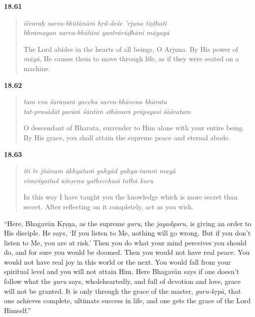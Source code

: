 \par\noindent\textbf{18.61}\par
\begin{verse}
\textit{īśvaraḥ sarva-bhūtānāṁ hṛd-deśe ’rjuna tiṣṭhati} \\
\textit{bhrāmayan sarva-bhūtāni yantrārūḍhāni māyayā}

\noindent The Lord abides in the hearts of all beings, O Arjuna. By His power of \textit{māyā}, He causes them to move through life, as if they were seated on a machine.
\end{verse}
\par



\par\noindent\textbf{18.62}\par
\begin{verse}
\textit{tam eva śaraṇaṁ gaccha sarva-bhāvena bhārata} \\
\textit{tat-prasādāt parāṁ śāntiṁ sthānaṁ prāpsyasi śāśvatam}

\noindent O descendant of Bharata, surrender to Him alone with your entire being. By His grace, you shall attain the supreme peace and eternal abode.
\end{verse}
\par



\par\noindent\textbf{18.63}\par
\begin{verse}
\textit{iti te jñānam ākhyātaṁ guhyād guhya-taraṁ mayā} \\
\textit{vimṛśyaitad aśeṣeṇa yathecchasi tathā kuru}

\noindent In this way I have taught you the knowledge which is more secret than secret. After reflecting on it completely, act as you wish.
\end{verse}
\par


\enquote{Here, Bhagavān Kṛṣṇa, as the supreme \textit{guru}, the \textit{jagadguru}, is giving an order to His disciple. He says, \enquote{If you listen to Me, nothing will go wrong. But if you don’t listen to Me, you are at risk.} Then you do what your mind perceives you should do, and for sure you would be doomed. Then you would not have real peace. You would not have real joy in this world or the next. You would fall from your spiritual level and you will not attain Him. Here Bhagavān says if one doesn’t follow what the \textit{guru} says, wholeheartedly, and full of devotion and love, grace will not be granted. It is only through the grace of the master, \textit{guru-kṛpā}, that one achieves complete, ultimate success in life, and one gets the grace of the Lord Himself.}

